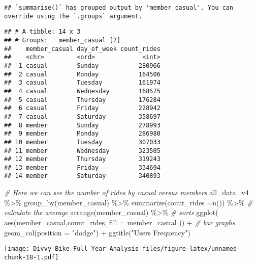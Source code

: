 \documentclass[
]{article}
\newenvironment{Shaded}{\begin{snugshade}}{\end{snugshade}}
\newcommand{\AttributeTok}[1]{\textcolor[rgb]{0.77,0.63,0.00}{#1}}
\newcommand{\CommentTok}[1]{\textcolor[rgb]{0.56,0.35,0.01}{\textit{#1}}}
\newcommand{\FunctionTok}[1]{\textcolor[rgb]{0.00,0.00,0.00}{#1}}
\newcommand{\NormalTok}[1]{#1}
\newcommand{\SpecialCharTok}[1]{\textcolor[rgb]{0.00,0.00,0.00}{#1}}
\newcommand{\StringTok}[1]{\textcolor[rgb]{0.31,0.60,0.02}{#1}}
\begin{document}
\begin{verbatim}
## `summarise()` has grouped output by 'member_casual'. You can override using the `.groups` argument.
\end{verbatim}

\begin{verbatim}
## # A tibble: 14 x 3
## # Groups:   member_casual [2]
##    member_casual day_of_week count_rides
##    <chr>         <ord>             <int>
##  1 casual        Sunday           280966
##  2 casual        Monday           164506
##  3 casual        Tuesday          161974
##  4 casual        Wednesday        168575
##  5 casual        Thursday         176284
##  6 casual        Friday           228942
##  7 casual        Saturday         358697
##  8 member        Sunday           278993
##  9 member        Monday           286980
## 10 member        Tuesday          307033
## 11 member        Wednesday        323505
## 12 member        Thursday         319243
## 13 member        Friday           334694
## 14 member        Saturday         340893
\end{verbatim}

\begin{Shaded}
\begin{Highlighting}[]
\CommentTok{\# Here we can see the number of  rides by casual versus members}
\NormalTok{   all\_data\_v4 }\SpecialCharTok{\%\textgreater{}\%}
      \FunctionTok{group\_by}\NormalTok{(member\_casual) }\SpecialCharTok{\%\textgreater{}\%}
      \FunctionTok{summarize}\NormalTok{(}\AttributeTok{count\_rides =}\FunctionTok{n}\NormalTok{()) }\SpecialCharTok{\%\textgreater{}\%} \CommentTok{\# calculate the average}
      \FunctionTok{arrange}\NormalTok{(member\_casual) }\SpecialCharTok{\%\textgreater{}\%}                     \CommentTok{\# sorts}
      \FunctionTok{ggplot}\NormalTok{( }\FunctionTok{aes}\NormalTok{(member\_casual,count\_rides, }\AttributeTok{fill =}\NormalTok{ member\_casual  )) }\SpecialCharTok{+} \CommentTok{\# bar graphs}
      \FunctionTok{geom\_col}\NormalTok{(}\AttributeTok{position =} \StringTok{"dodge"}\NormalTok{)  }\SpecialCharTok{+} \FunctionTok{ggtitle}\NormalTok{(}\StringTok{"Users Frequency"}\NormalTok{) }
\end{Highlighting}
\end{Shaded}

\texttt{[image: Divvy\_Bike\_Full\_Year\_Analysis\_files/figure-latex/unnamed-chunk-18-1.pdf]}
\end{document}
